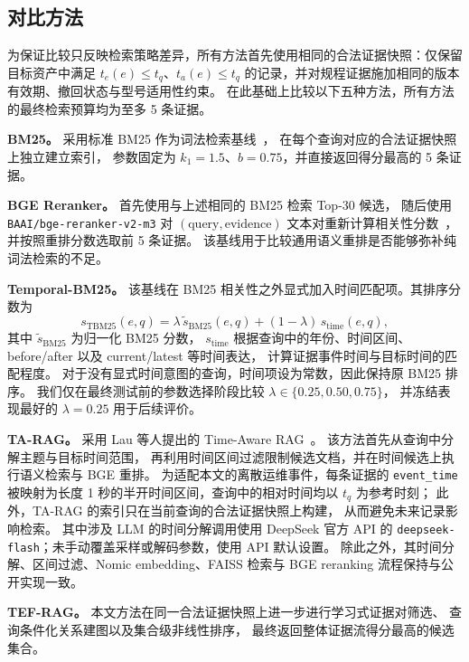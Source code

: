 \subsection{对比方法}
\label{sec:baselines}

为保证比较只反映检索策略差异，所有方法首先使用相同的合法证据快照：仅保留目标资产中满足
$t_e(e)\le t_q$、$t_a(e)\le t_q$ 的记录，并对规程证据施加相同的版本有效期、撤回状态与型号适用性约束。
在此基础上比较以下五种方法，所有方法的最终检索预算均为至多 5 条证据。

\textbf{BM25。}
采用标准 BM25 作为词法检索基线~\cite{robertson2009bm25}，
在每个查询对应的合法证据快照上独立建立索引，
参数固定为 $k_1=1.5$、$b=0.75$，并直接返回得分最高的 5 条证据。

\textbf{BGE Reranker。}
首先使用与上述相同的 BM25 检索 Top-30 候选，
随后使用 \texttt{BAAI/bge-reranker-v2-m3} 对
$(\text{query},\text{evidence})$ 文本对重新计算相关性分数~\cite{chen2024bgem3,flagembedding2026reranker}，
并按照重排分数选取前 5 条证据。
该基线用于比较通用语义重排是否能够弥补纯词法检索的不足。

\textbf{Temporal-BM25。}
该基线在 BM25 相关性之外显式加入时间匹配项。其排序分数为
\begin{equation}
s_{\mathrm{TBM25}}(e,q)
=
\lambda\,\widetilde{s}_{\mathrm{BM25}}(e,q)
+
(1-\lambda)\,s_{\mathrm{time}}(e,q),
\end{equation}
其中 $\widetilde{s}_{\mathrm{BM25}}$ 为归一化 BM25 分数，
$s_{\mathrm{time}}$ 根据查询中的年份、时间区间、before/after 以及 current/latest 等时间表达，
计算证据事件时间与目标时间的匹配程度。
对于没有显式时间意图的查询，时间项设为常数，因此保持原 BM25 排序。
我们仅在最终测试前的参数选择阶段比较 $\lambda\in\{0.25,0.50,0.75\}$，
并冻结表现最好的 $\lambda=0.25$ 用于后续评价。

\textbf{TA-RAG。}
采用 Lau 等人提出的 Time-Aware RAG~\cite{lau2025tarag}。
该方法首先从查询中分解主题与目标时间范围，
再利用时间区间过滤限制候选文档，并在时间候选上执行语义检索与 BGE 重排。
为适配本文的离散运维事件，每条证据的 \texttt{event\_time}
被映射为长度 1 秒的半开时间区间，查询中的相对时间均以 $t_q$ 为参考时刻；
此外，TA-RAG 的索引只在当前查询的合法证据快照上构建，
从而避免未来记录影响检索。
其中涉及 LLM 的时间分解调用使用 DeepSeek 官方 API 的
\texttt{deepseek-flash}；未手动覆盖采样或解码参数，使用 API 默认设置。
除此之外，其时间分解、区间过滤、Nomic embedding、FAISS 检索与 BGE reranking
流程保持与公开实现一致。

\textbf{TEF-RAG。}
本文方法在同一合法证据快照上进一步进行学习式证据对筛选、
查询条件化关系建图以及集合级非线性排序，
最终返回整体证据流得分最高的候选集合。


